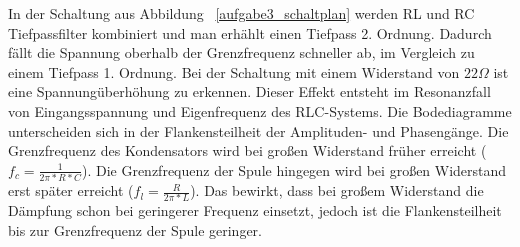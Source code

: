 \documentclass[12pt,a4paper,titlepage]{article}
\begin{document}
\noindent In der Schaltung aus Abbildung ~\ref{aufgabe3_schaltplan} werden RL und RC Tiefpassfilter kombiniert und man erh\"ahlt einen Tiefpass 2. Ordnung. Dadurch f\"allt die Spannung oberhalb der Grenzfrequenz schneller ab, im Vergleich zu einem Tiefpass 1. Ordnung. Bei der Schaltung mit einem Widerstand von $22 \Omega$ ist eine Spannung\"uberh\"ohung zu erkennen. Dieser Effekt entsteht im Resonanzfall von Eingangsspannung und Eigenfrequenz des RLC-Systems. Die Bodediagramme unterscheiden sich in der Flankensteilheit der Amplituden- und Phaseng\"ange. Die Grenzfrequenz des Kondensators wird bei gro\ss en Widerstand fr\"uher erreicht ($f_c = \frac{1}{2\pi*R*C}$). Die Grenzfrequenz der Spule hingegen wird bei gro\ss en Widerstand erst sp\"ater erreicht ($f_l = \frac{R}{2\pi*L}$). Das bewirkt, dass bei gro\ss em Widerstand die D\"ampfung schon bei geringerer Frequenz einsetzt, jedoch ist die Flankensteilheit bis zur Grenzfrequenz der Spule geringer.
\end{document}
